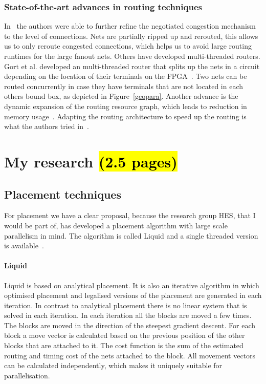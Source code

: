 \documentclass[a4paper,oneside,12pt]{article}
\begin{document}
\subsubsection{State-of-the-art advances in routing techniques}
In~\cite{vansteenkiste2013connection} the authors were able to further refine the negotiated congestion mechanism to the level of connections. Nets are partially ripped up and rerouted, this allows us to only reroute congested connections, which helps us to avoid large routing runtimes for the large fanout nets. Others have developed multi-threaded routers. Gort et al. developed an multi-threaded router that splits up the nets in a circuit depending on the location of their terminals on the FPGA~\cite{gort2010deterministic}. Two nets can be routed concurrently in case they have terminals that are not located in each others bound box, as depicted in Figure~\ref{geopara}.
Another advance is the dynamic expansion of the routing resource graph, which leads to reduction in memory usage~\cite{moctar2015fast}. 	
Adapting the routing architecture to speed up the routing is what the authors tried in~\cite{gort2013combined}.


\section{My research \hl{(2.5 pages)}}

\subsection{Placement techniques}\label{placetech}

For placement we have a clear proposal, because the research group HES, that I would be part of, has developed a placement algorithm with large scale parallelism in mind. The algorithm is called Liquid and a single threaded version is available~\cite{liquid}.

\paragraph{Liquid}
Liquid is based on analytical placement. It is also an iterative algorithm in which optimised placement and legalised versions of the placement are generated in each iteration. In contrast to analytical placement there is no linear system that is solved in each iteration. In each iteration all the blocks are moved a few times.  The blocks are moved in the direction of the steepest gradient descent. For each block a move vector is calculated based on the previous position of the other blocks that are attached to it. The cost function is the sum of the estimated routing and timing cost of the nets attached to the block. All movement vectors can be calculated independently, which makes it uniquely suitable for parallelisation.
\end{document}
